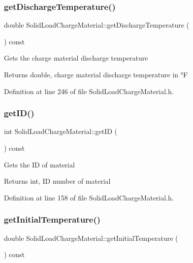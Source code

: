 \subsubsection{\texorpdfstring{get\+Discharge\+Temperature()}{getDischargeTemperature()}}
{\footnotesize\ttfamily double Solid\+Load\+Charge\+Material\+::get\+Discharge\+Temperature (\begin{DoxyParamCaption}{ }\end{DoxyParamCaption}) const\hspace{0.3cm}{\ttfamily [inline]}}

Gets the charge material discharge temperature \begin{DoxyReturn}{Returns}
double, charge material discharge temperature in °F 
\end{DoxyReturn}


Definition at line 246 of file Solid\+Load\+Charge\+Material.\+h.

\mbox{\label{class_solid_load_charge_material_a99a4a5d50309c37bf95cb2b446bcba04}} 
\subsubsection{\texorpdfstring{get\+I\+D()}{getID()}}
{\footnotesize\ttfamily int Solid\+Load\+Charge\+Material\+::get\+ID (\begin{DoxyParamCaption}{ }\end{DoxyParamCaption}) const\hspace{0.3cm}{\ttfamily [inline]}}

Gets the ID of material \begin{DoxyReturn}{Returns}
int, ID number of material 
\end{DoxyReturn}


Definition at line 158 of file Solid\+Load\+Charge\+Material.\+h.

\mbox{\label{class_solid_load_charge_material_ae5d7f198fb1d4a3adb0cfc911a13ea06}} 
\subsubsection{\texorpdfstring{get\+Initial\+Temperature()}{getInitialTemperature()}}
{\footnotesize\ttfamily double Solid\+Load\+Charge\+Material\+::get\+Initial\+Temperature (\begin{DoxyParamCaption}{ }\end{DoxyParamCaption}) const\hspace{0.3cm}{\ttfamily [inline]}}

